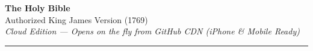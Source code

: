 \documentclass[10pt,letterpaper]{article}
\begin{document}


\pagestyle{empty}

\begin{center}
    {\LARGE\bfseries The Holy Bible}\\[0.2em]
    {\normalsize Authorized King James Version (1769)}\\[0.25em]
    {\footnotesize\itshape Cloud Edition --- Opens on the fly from GitHub CDN (iPhone \& Mobile Ready)}\\[0.4em]
    \rule{0.85\linewidth}{0.4pt}
\end{center}

\vspace{-0.2em}
\end{document}
